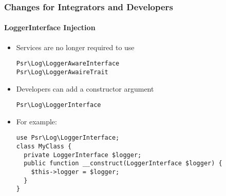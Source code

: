%

\begin{frame}[fragile]
	\frametitle{Changes for Integrators and Developers}
	\framesubtitle{LoggerInterface Injection}


	\begin{itemize}
		\item Services are no longer required to use
\begin{lstlisting}
Psr\Log\LoggerAwareInterface
Psr\Log\LoggerAwaireTrait
\end{lstlisting}
		\item Developers can add a constructor argument
\begin{lstlisting}
Psr\Log\LoggerInterface
\end{lstlisting}
		\item For example:
\begin{lstlisting}
use Psr\Log\LoggerInterface;
class MyClass {
  private LoggerInterface $logger;
  public function __construct(LoggerInterface $logger) {
    $this->logger = $logger;
  }
}
\end{lstlisting}
	\end{itemize}

\end{frame}

